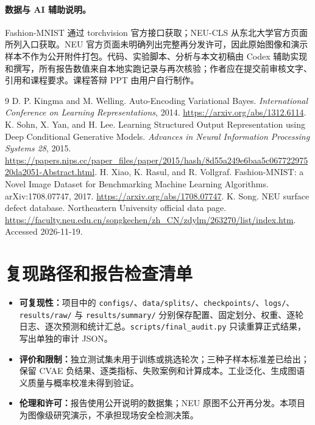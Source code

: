 \documentclass{article}
\begin{document}
\paragraph{数据与 AI 辅助说明。}Fashion-MNIST 通过 torchvision 官方接口获取；NEU-CLS 从东北大学官方页面所列入口获取。NEU 官方页面未明确列出完整再分发许可，因此原始图像和演示样本不作为公开附件打包。代码、实验脚本、分析与本文初稿由 Codex 辅助实现和撰写，所有报告数值来自本地实跑记录与再次核验；作者应在提交前审核文字、引用和课程要求。课程答辩 PPT 由用户自行制作。

\clearpage
\begin{thebibliography}{9}
 D. P. Kingma and M. Welling. Auto-Encoding Variational Bayes. \emph{International Conference on Learning Representations}, 2014. \url{https://arxiv.org/abs/1312.6114}.
 K. Sohn, X. Yan, and H. Lee. Learning Structured Output Representation using Deep Conditional Generative Models. \emph{Advances in Neural Information Processing Systems 28}, 2015. \url{https://papers.nips.cc/paper_files/paper/2015/hash/8d55a249e6baa5c06772297520da2051-Abstract.html}.
 H. Xiao, K. Rasul, and R. Vollgraf. Fashion-MNIST: a Novel Image Dataset for Benchmarking Machine Learning Algorithms. arXiv:1708.07747, 2017. \url{https://arxiv.org/abs/1708.07747}.
 K. Song. NEU surface defect database. Northeastern University official data page. \url{https://faculty.neu.edu.cn/songkechen/zh_CN/zdylm/263270/list/index.htm}. Accessed 2026-11-19.
\end{thebibliography}

\appendix
\section{复现路径和报告检查清单}
\begin{itemize}
\item \textbf{可复现性：}项目中的 \texttt{configs/}、\texttt{data/splits/}、\texttt{checkpoints/}、\texttt{logs/}、\texttt{results/raw/} 与 \texttt{results/summary/} 分别保存配置、固定划分、权重、逐轮日志、逐次预测和统计汇总。\texttt{scripts/final\_audit.py} 只读重算正式结果，写出单独的审计 JSON。
\item \textbf{评价和限制：}独立测试集未用于训练或挑选轮次；三种子样本标准差已给出；保留 CVAE 负结果、逐类指标、失败案例和计算成本。工业泛化、生成图语义质量与概率校准未得到验证。
\item \textbf{伦理和许可：}报告使用公开说明的数据集；NEU 原图不公开再分发。本项目为图像级研究演示，不承担现场安全检测决策。
\end{itemize}
\end{document}
